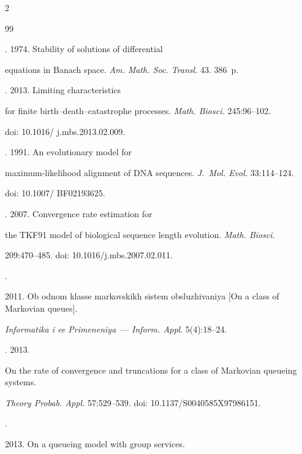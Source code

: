 \begin{multicols}{2}
{{\begin{thebibliography}{99}
\columnbreak




. 1974. Stability of solutions of differential

equations in Banach space. \textit{Am. Math. Soc. Transl.} 43. 386~p.


. 2013. Limiting characteristics

for finite birth--death--catastrophe processes. \textit{Math. Biosci.} 245:96--102. 

doi: 10.1016/ j.mbs.2013.02.009.


. 1991. An evolutionary model for

maximum-likelihood alignment of DNA sequences. \textit{J.~Mol. Evol.} 33:114--124. 

doi: 10.1007/ BF02193625.


. 2007. Convergence rate estimation for

the TKF91 model of biological sequence length evolution. \textit{Math. Biosci.}

209:470--485. doi: 10.1016/j.mbs.2007.02.011.


.

2011. Ob odnom klasse markovskikh sistem obsluzhivaniya [On a class of Markovian queues].

\textit{Informatika i ee Primeneniya}~--- \textit{Inform. Appl}. 5(4):18--24.


. 2013.

On the rate of convergence and truncations for a class of Markovian queueing systems.

\textit{Theory Probab. Appl.} 57:529--539. doi: 10.1137/S0040585X97986151.


.

2013. On a queueing model with group services.


\end{thebibliography}}}
\end{multicols}
